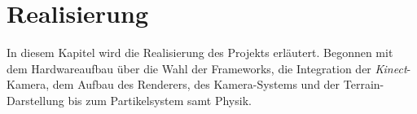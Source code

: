 \chapter{Realisierung}
\begin{Spacing}{\mylinespace}

In diesem Kapitel wird die Realisierung des Projekts erläutert. Begonnen mit dem Hardwareaufbau über die Wahl der Frameworks, die Integration der \textit{Kinect}-Kamera, dem Aufbau des Renderers, des Kamera-Systems und der Terrain-Darstellung bis zum Partikelsystem samt Physik.  \\


\clearpage

\clearpage

\clearpage

\clearpage

\clearpage

\clearpage

\clearpage

\clearpage

\clearpage

\end{Spacing}
\newpage
\clearpage
